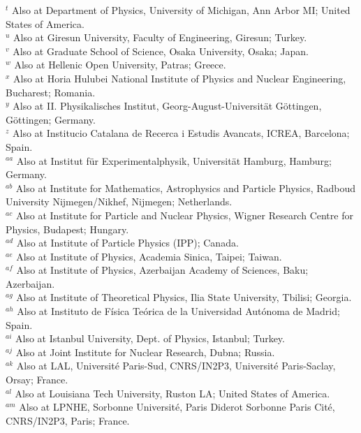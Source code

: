\begin{flushleft}
$^{t}$ Also at Department of Physics, University of Michigan, Ann Arbor MI; United States of America.\\
$^{u}$ Also at Giresun University, Faculty of Engineering, Giresun; Turkey.\\
$^{v}$ Also at Graduate School of Science, Osaka University, Osaka; Japan.\\
$^{w}$ Also at Hellenic Open University, Patras; Greece.\\
$^{x}$ Also at Horia Hulubei National Institute of Physics and Nuclear Engineering, Bucharest; Romania.\\
$^{y}$ Also at II. Physikalisches Institut, Georg-August-Universit\"{a}t G\"ottingen, G\"ottingen; Germany.\\
$^{z}$ Also at Institucio Catalana de Recerca i Estudis Avancats, ICREA, Barcelona; Spain.\\
$^{aa}$ Also at Institut f\"{u}r Experimentalphysik, Universit\"{a}t Hamburg, Hamburg; Germany.\\
$^{ab}$ Also at Institute for Mathematics, Astrophysics and Particle Physics, Radboud University Nijmegen/Nikhef, Nijmegen; Netherlands.\\
$^{ac}$ Also at Institute for Particle and Nuclear Physics, Wigner Research Centre for Physics, Budapest; Hungary.\\
$^{ad}$ Also at Institute of Particle Physics (IPP); Canada.\\
$^{ae}$ Also at Institute of Physics, Academia Sinica, Taipei; Taiwan.\\
$^{af}$ Also at Institute of Physics, Azerbaijan Academy of Sciences, Baku; Azerbaijan.\\
$^{ag}$ Also at Institute of Theoretical Physics, Ilia State University, Tbilisi; Georgia.\\
$^{ah}$ Also at Instituto de Física Teórica de la Universidad Autónoma de Madrid; Spain.\\
$^{ai}$ Also at Istanbul University, Dept. of Physics, Istanbul; Turkey.\\
$^{aj}$ Also at Joint Institute for Nuclear Research, Dubna; Russia.\\
$^{ak}$ Also at LAL, Universit\'e Paris-Sud, CNRS/IN2P3, Universit\'e Paris-Saclay, Orsay; France.\\
$^{al}$ Also at Louisiana Tech University, Ruston LA; United States of America.\\
$^{am}$ Also at LPNHE, Sorbonne Universit\'e, Paris Diderot Sorbonne Paris Cit\'e, CNRS/IN2P3, Paris; France.\\

\end{flushleft}
